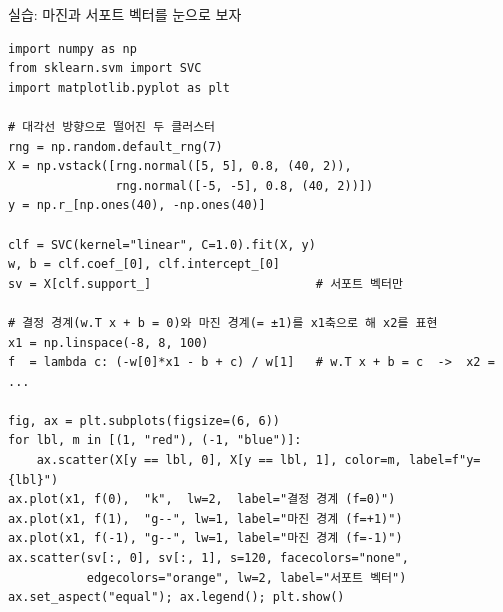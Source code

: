 \begin{frame}[fragile]{실습: 마진과 서포트 벡터를 눈으로 보자}
  \begingroup\lstset{basicstyle=\ttfamily\tiny}
  \begin{lstlisting}
import numpy as np
from sklearn.svm import SVC
import matplotlib.pyplot as plt

# 대각선 방향으로 떨어진 두 클러스터
rng = np.random.default_rng(7)
X = np.vstack([rng.normal([5, 5], 0.8, (40, 2)),
               rng.normal([-5, -5], 0.8, (40, 2))])
y = np.r_[np.ones(40), -np.ones(40)]

clf = SVC(kernel="linear", C=1.0).fit(X, y)
w, b = clf.coef_[0], clf.intercept_[0]
sv = X[clf.support_]                       # 서포트 벡터만

# 결정 경계(w.T x + b = 0)와 마진 경계(= ±1)를 x1축으로 해 x2를 표현
x1 = np.linspace(-8, 8, 100)
f  = lambda c: (-w[0]*x1 - b + c) / w[1]   # w.T x + b = c  ->  x2 = ...

fig, ax = plt.subplots(figsize=(6, 6))
for lbl, m in [(1, "red"), (-1, "blue")]:
    ax.scatter(X[y == lbl, 0], X[y == lbl, 1], color=m, label=f"y={lbl}")
ax.plot(x1, f(0),  "k",  lw=2,  label="결정 경계 (f=0)")
ax.plot(x1, f(1),  "g--", lw=1, label="마진 경계 (f=+1)")
ax.plot(x1, f(-1), "g--", lw=1, label="마진 경계 (f=-1)")
ax.scatter(sv[:, 0], sv[:, 1], s=120, facecolors="none",
           edgecolors="orange", lw=2, label="서포트 벡터")
ax.set_aspect("equal"); ax.legend(); plt.show()
\end{lstlisting}
  \endgroup
\end{frame}
